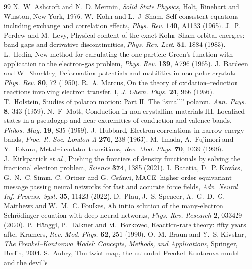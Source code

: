 \documentclass[11pt]{article}
\begin{document}
\begin{thebibliography}{99}
 N.~W. Ashcroft and N.~D. Mermin, \emph{Solid State Physics}, Holt, Rinehart and
Winston, New York, 1976.
 W.~Kohn and L.~J. Sham, Self-consistent equations including exchange and
correlation effects, \emph{Phys. Rev.} \textbf{140}, A1133 (1965).
 J.~P. Perdew and M.~Levy, Physical content of the exact Kohn--Sham orbital
energies: band gaps and derivative discontinuities, \emph{Phys. Rev. Lett.} \textbf{51}, 1884 (1983).
 L.~Hedin, New method for calculating the one-particle Green's function with
application to the electron-gas problem, \emph{Phys. Rev.} \textbf{139}, A796 (1965).
 J.~Bardeen and W.~Shockley, Deformation potentials and mobilities in non-polar
crystals, \emph{Phys. Rev.} \textbf{80}, 72 (1950).
 R.~A. Marcus, On the theory of oxidation--reduction reactions involving electron
transfer. I, \emph{J. Chem. Phys.} \textbf{24}, 966 (1956).
 T.~Holstein, Studies of polaron motion: Part II. The ``small'' polaron,
\emph{Ann. Phys.} \textbf{8}, 343 (1959).
 N.~F. Mott, Conduction in non-crystalline materials III. Localized states in a
pseudogap and near extremities of conduction and valence bands, \emph{Philos. Mag.} \textbf{19}, 835
(1969).
 J.~Hubbard, Electron correlations in narrow energy bands, \emph{Proc. R. Soc.
London A} \textbf{276}, 238 (1963).
 M.~Imada, A.~Fujimori and Y.~Tokura, Metal--insulator transitions, \emph{Rev. Mod.
Phys.} \textbf{70}, 1039 (1998).
 J.~Kirkpatrick \emph{et al.}, Pushing the frontiers of density functionals by
solving the fractional electron problem, \emph{Science} \textbf{374}, 1385 (2021).
 I.~Batatia, D.~P. Kov\'acs, G.~N.~C. Simm, C.~Ortner and G.~Cs\'anyi, MACE: higher
order equivariant message passing neural networks for fast and accurate force fields,
\emph{Adv. Neural Inf. Process. Syst.} \textbf{35}, 11423 (2022).
 D.~Pfau, J.~S. Spencer, A.~G.~D.~G. Matthews and W.~M.~C. Foulkes, Ab initio
solution of the many-electron Schr\"odinger equation with deep neural networks, \emph{Phys. Rev.
Research} \textbf{2}, 033429 (2020).
 P.~H\"anggi, P.~Talkner and M.~Borkovec, Reaction-rate theory: fifty years after
Kramers, \emph{Rev. Mod. Phys.} \textbf{62}, 251 (1990).
 O.~M. Braun and Y.~S. Kivshar, \emph{The Frenkel--Kontorova Model: Concepts, Methods,
and Applications}, Springer, Berlin, 2004.
 S.~Aubry, The twist map, the extended Frenkel--Kontorova model and the devil's

\end{thebibliography}
\end{document}
